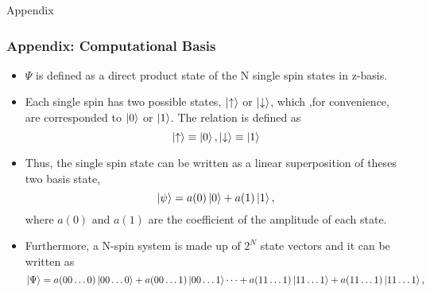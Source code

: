 \documentclass{beamer}
\begin{document}
\appendix

\mode*

\begin{frame}
	\centering
	Appendix
\end{frame}


\begin{frame}
	\frametitle{Appendix: Computational Basis}
	\begin{itemize}
		\item $\Psi$ is defined as a direct product state of the N single spin states in z-basis.
		
		\item Each single spin has two possible states, $\ket{\uparrow}$ or $\ket{\downarrow}$, which ,for convenience, are corresponded to $\ket{0}$ or $\ket{1}$. The relation is defined as 	
		\begin{equation*}
		\ket{\uparrow}\equiv \ket{0}, \ket{\downarrow} \equiv \ket{1}
		\end{equation*}
		
		\item 
		Thus, the single spin state can be written as a linear superposition of theses two basis state, 	
		\begin{equation*}
		\ket{\psi} = a(0)\ket{0} + a(1)\ket{1},
		\end{equation*}
		where $a(0)$ and $a(1)$ are the coefficient of the amplitude of each state.
		
		\item Furthermore, a N-spin system is made up of $2^N$ state vectors and it can be written as 	
		\begin{equation*}
		\label{psi_in_compuationalbasis}
		\ket{\Psi} = a(00\dots0)\ket{00\dots0}+a(00\dots1)\ket{00\dots1}\cdots +a(11\dots1)\ket{11\dots1}+a(11\dots1)\ket{11\dots1},
		\end{equation*}
		
	\end{itemize}
	
\end{frame}
\end{document}
